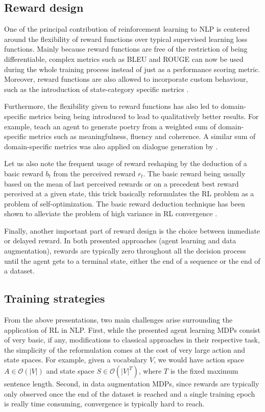 \documentclass[twocolumn]{article}
\begin{document}
\subsection{Reward design}

One of the principal contribution of reinforcement learning to NLP is centered around the flexibility of reward functions over typical supervised learning loss functions. Mainly because reward functions are free of the restriction of being differentiable, complex metrics such as BLEU and ROUGE can now be used during the whole training process instead of just as a performance scoring metric. Moreover, reward functions are also allowed to incorporate custom behaviour, such as the introduction of state-category specific metrics \citep{DBLP:journals/corr/Guo15b}. 

Furthermore, the flexibility given to reward functions has also led to domain-specific metrics being being introduced to lead to qualitatively better results. For example, \cite{D18-1353} teach an agent to generate poetry from a weighted sum of domain-specific metrics such as meaningfulness, fluency and coherence. A similar sum of domain-specific metrics was also applied on dialogue generation by \citep{DBLP:journals/corr/LiMRGGJ16}.

Let us also note the frequent usage of reward reshaping by the deduction of a basic reward $b_t$ from the perceived reward $r_t$. The basic reward being usually based on the mean of last perceived rewards or on a precedent best reward perceived at a given state, this trick basically reformulates the RL problem as a problem of self-optimization. The basic reward deduction technique has been shown to alleviate the problem of high variance in RL convergence \citep{drl-that-matters}.

Finally, another important part of reward design is the choice between immediate or delayed reward. In both presented approaches (agent learning and data augmentation), rewards are typically zero throughout all the decision process until the agent gets to a terminal state, either the end of a sequence or the end of a dataset.

\subsection{Training strategies}

From the above presentations, two main challenges arise surrounding the application of RL in NLP. First, while the presented agent learning MDPs consist of very basic, if any, modifications to classical approaches in their respective task, the simplicity of the reformulation comes at the cost of very large  action and state spaces. For example, given a vocabulary $V$, we would have action space $A \in \mathcal{O}(|V|)$ and state space $S \in \mathcal{O}(|V|^T)$, where $T$ is the fixed maximum sentence length. Second, in data augmentation MDPs, since rewards are typically only observed once the end of the dataset is reached and a single training epoch is really time consuming, convergence is typically hard to reach.
\end{document}
